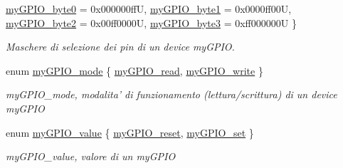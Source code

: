 \begin{DoxyCompactItemize}
\hyperlink{group__bare-metal_gga402a0d20afc0cb7c25554b8b023f4253a0347b1742eef6b2575a7d409c7fb5c3d}{my\+G\+P\+I\+O\+\_\+byte0} = 0x000000ff\+U, 
\hyperlink{group__bare-metal_gga402a0d20afc0cb7c25554b8b023f4253ae5aec65fa20f554b893e419fc2755fd0}{my\+G\+P\+I\+O\+\_\+byte1} = 0x0000ff00\+U, 
\hyperlink{group__bare-metal_gga402a0d20afc0cb7c25554b8b023f4253af4892f7db28c64a7cf2a7236c88b742b}{my\+G\+P\+I\+O\+\_\+byte2} = 0x00ff0000\+U, 
\hyperlink{group__bare-metal_gga402a0d20afc0cb7c25554b8b023f4253a1ceefb9d65397352e986c573984d0129}{my\+G\+P\+I\+O\+\_\+byte3} = 0xff000000\+U
 \}
\begin{DoxyCompactList}\small\item\em Maschere di selezione dei pin di un device my\+G\+P\+I\+O. \end{DoxyCompactList}\item 
enum \hyperlink{group__bare-metal_ga76b849f0e0c05e7f9161bdb33396f2b1}{my\+G\+P\+I\+O\+\_\+mode} \{ \hyperlink{group__bare-metal_gga76b849f0e0c05e7f9161bdb33396f2b1a1e6dc78e7641e878cadc842d39605d5d}{my\+G\+P\+I\+O\+\_\+read}, 
\hyperlink{group__bare-metal_gga76b849f0e0c05e7f9161bdb33396f2b1a2d66976280eb7595a42c631683bdfad6}{my\+G\+P\+I\+O\+\_\+write}
 \}
\begin{DoxyCompactList}\small\item\em my\+G\+P\+I\+O\+\_\+mode, modalita' di funzionamento (lettura/scrittura) di un device my\+G\+P\+I\+O \end{DoxyCompactList}\item 
enum \hyperlink{group__bare-metal_gaf634fe4a0e1eab8da5000b72d6ad362b}{my\+G\+P\+I\+O\+\_\+value} \{ \hyperlink{group__bare-metal_ggaf634fe4a0e1eab8da5000b72d6ad362ba98cde80dbda025bd1ae7231c76b55674}{my\+G\+P\+I\+O\+\_\+reset}, 
\hyperlink{group__bare-metal_ggaf634fe4a0e1eab8da5000b72d6ad362ba10d296f3711d01189cc6c2d87f7c9149}{my\+G\+P\+I\+O\+\_\+set}
 \}
\begin{DoxyCompactList}\small\item\em my\+G\+P\+I\+O\+\_\+value, valore di un my\+G\+P\+I\+O \end{DoxyCompactList}\end{DoxyCompactItemize}
